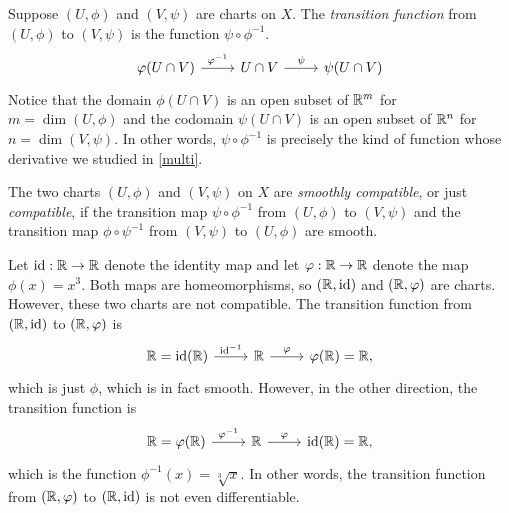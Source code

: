 \begin{definition} \label{transition-map} 
	Suppose $(U, \phi)$ and $(V, \psi)$ are charts on $X$. The \emph{transition function} from $(U, \phi)$ to $(V, \psi)$ is the function $\psi \circ \phi^{-1}$.
	\[ \begin{tikzcd}
	\phi(U \cap V) \ar{r}{\phi^{-1}} & U \cap V \ar{r}{\psi} & \psi(U \cap V)
	\end{tikzcd} \]
	Notice that the domain $\phi(U \cap V)$ is an open subset of $\mathbb{R}^m$ for $m = \dim(U, \phi)$ and the codomain $\psi(U \cap V)$ is an open subset of $\mathbb{R}^n$ for $n = \dim(V, \psi)$. In other words, $\psi \circ \phi^{-1}$ is precisely the kind of function whose derivative we studied in \cref{multi}. 
\end{definition}

\begin{definition}  \label{compatibility}
	The two charts $(U, \phi)$ and $(V, \psi)$ on $X$ are \emph{smoothly compatible}, or just \emph{compatible}, if the transition map $\psi \circ \phi^{-1}$ from $(U, \phi)$ to $(V, \psi)$ and the transition map $\phi \circ \psi^{-1}$ from $(V, \psi)$ to $(U, \phi)$ are smooth. 
\end{definition}

\begin{example} \label{cube-not-compatible}
	Let $\mathrm{id} : \mathbb{R} \to \mathbb{R}$ denote the identity map and let $\varphi : \mathbb{R} \to  \mathbb{R}$ denote the map $\phi(x) = x^3$. Both maps are homeomorphisms, so $(\mathbb{R}, \mathrm{id})$ and $(\mathbb{R}, \varphi)$ are charts. However, these two charts are not compatible. The transition function from $(\mathbb{R}, \mathrm{id})$ to $(\mathbb{R}, \varphi)$ is 
	\[ \begin{tikzcd} \R = \id(\R) \ar{r}{\id^{-1}} & \R \ar{r}{\phi} & \phi(\R) = \R, \end{tikzcd} \]
	which is just $\phi$, which is in fact smooth. However, in the other direction, the transition function is 
	\[ \begin{tikzcd} \R = \phi(\R) \ar{r}{\phi^{-1}} & \R \ar{r}{\phi} & \id(\R) = \R, \end{tikzcd} \]
	which is the function $\phi^{-1}(x) = \sqrt[3]{x}$. In other words, the transition function from $(\mathbb{R}, \varphi)$ to $(\mathbb{R}, \mathrm{id})$ is not even differentiable. 
\end{example}

